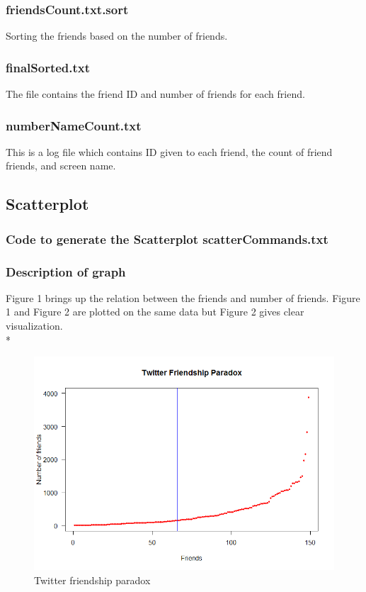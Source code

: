 \documentclass[12pt]{article}
\begin{document}
\subsubsection{friendsCount.txt.sort}
Sorting the friends based on the number of friends.


\subsubsection{finalSorted.txt}
The file contains the friend ID and number of friends for each friend.


\subsubsection{numberNameCount.txt}
This is a log file which contains ID given to each friend, the count of friend friends, and screen name.

\newpage


\subsection{Scatterplot}
\subsubsection{Code to generate the Scatterplot scatterCommands.txt}

\subsubsection{Description of graph}
Figure 1 brings up the relation between the friends and number of friends. Figure 1 and Figure 2 are plotted on the same data but Figure 2 gives clear visualization.\\* 

\begin{figure}[ht]
\includegraphics[scale=0.7]{../twitter/scatterplot}
\centering
\caption{Twitter friendship paradox}
\label{intial-scatterplot}
\end{figure}
\newpage
\end{document}

